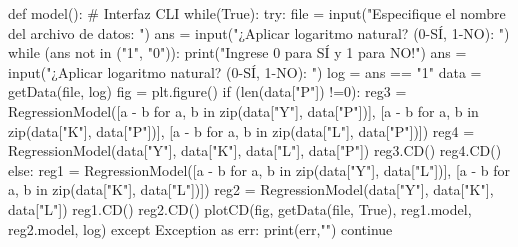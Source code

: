 \begin{pylabcode}[plotsession]
def model(): # Interfaz CLI
	while(True):
		try:
			file = input("Especifique el nombre del archivo de datos: ")
			ans = input("¿Aplicar logaritmo natural? (0-SÍ, 1-NO): ")
			while (ans not in ("1", "0")):
				print("Ingrese 0 para SÍ y 1 para NO!\n")
				ans = input("¿Aplicar logaritmo natural? (0-SÍ, 1-NO): ")
			log = ans == "1"
			data = getData(file, log)
			fig = plt.figure()
			if (len(data["P"]) !=0):
				reg3 = RegressionModel([a - b for a, b in zip(data["Y"], data["P"])],
				[a - b for a, b in zip(data["K"], data["P"])],
				[a - b for a, b in zip(data["L"], data["P"])])
				reg4 = RegressionModel(data["Y"], data["K"], data["L"], data["P"])
				reg3.CD()
				reg4.CD()
			else:
				reg1 = RegressionModel([a - b for a, b in zip(data["Y"], data["L"])],
				[a - b for a, b in zip(data["K"], data["L"])])
				reg2 = RegressionModel(data["Y"], data["K"], data["L"])
				reg1.CD()
				reg2.CD()
				plotCD(fig, getData(file, True), reg1.model, reg2.model, log)
		except Exception as err:
			print(err,"\n")
			continue
\end{pylabcode}

